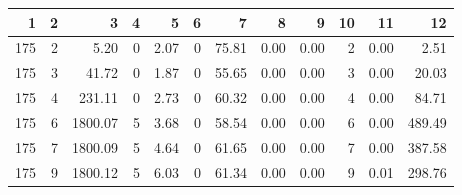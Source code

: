 \begin{tabular}{rrrrrrrrrrrr}
\toprule
1 & 2 & 3 & 4 & 5 & 6 & 7 & 8 & 9 & 10 & 11 & 12 \\
\midrule
175 & 2 & 5.20 & 0 & 2.07 & 0 & 75.81 & 0.00 & 0.00 & 2 & 0.00 & 2.51 \\
175 & 3 & 41.72 & 0 & 1.87 & 0 & 55.65 & 0.00 & 0.00 & 3 & 0.00 & 20.03 \\
175 & 4 & 231.11 & 0 & 2.73 & 0 & 60.32 & 0.00 & 0.00 & 4 & 0.00 & 84.71 \\
175 & 6 & 1800.07 & 5 & 3.68 & 0 & 58.54 & 0.00 & 0.00 & 6 & 0.00 & 489.49 \\
175 & 7 & 1800.09 & 5 & 4.64 & 0 & 61.65 & 0.00 & 0.00 & 7 & 0.00 & 387.58 \\
175 & 9 & 1800.12 & 5 & 6.03 & 0 & 61.34 & 0.00 & 0.00 & 9 & 0.01 & 298.76 \\
\bottomrule
\end{tabular}
